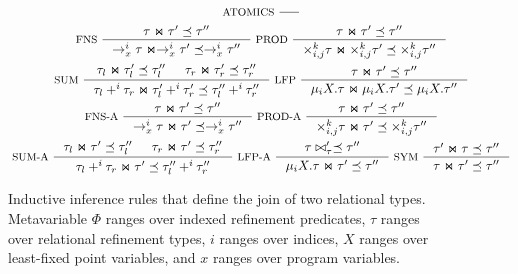 \begin{figure}
  \centering
  \begin{gather*}
    \inference[ ATOMICS ]{ }{ } \\
    \inference[ FNS ]{
      \tau \Join \tau' \subtype \tau'' }{
      \to_x^i \tau \Join \to_x^i \tau' \subtype \to_x^i \tau'' }
    \inference[ PROD ]{
      \tau \Join \tau' \subtype \tau'' }{
      \times_{i, j}^k \tau \Join %
      \times_{i, j}^k \tau' \subtype \times_{i, j}^k \tau'' } \\
    \inference[ SUM ]{
      \tau_l \Join \tau_l' \subtype \tau_l'' &
      \tau_r \Join \tau_r' \subtype \tau_r'' }{
      \tau_l +^i \tau_r \Join \tau_l' +^i \tau_r' %
      \subtype \tau_l'' +^i \tau_r'' } 
    \inference[ LFP ]{
      \tau \Join \tau' \subtype \tau'' }{
      \mu_i X. \tau \Join \mu_i X. \tau' \subtype %
      \mu_i X. \tau'' } \\
    \inference[ FNS-A ]{
      \tau \Join \tau' \subtype \tau'' }{
      \to_x^i \tau \Join \tau' \subtype \to_x^i \tau'' }
    \inference[ PROD-A ]{
      \tau \Join \tau' \subtype \tau'' }{
      \times_{i, j}^k \tau \Join \tau' \subtype %
      \times_{i, j}^k \tau'' } \\
    \inference[ SUM-A ]{
      \tau_l \Join \tau' \subtype \tau_l'' &
      \tau_r \Join \tau' \subtype \tau_r'' }{
      \tau_l +^i \tau_r \Join \tau' %
      \subtype \tau_l'' +^i \tau_r'' } 
    \inference[ LFP-A ]{
      \tau \join \tau' \subtype \tau'' }{
      \mu_i X. \tau \Join \tau' \subtype \tau'' } 
    \inference[ SYM ]{ %
      \tau' \Join \tau \subtype \tau'' }{ %
      \tau \Join \tau' \subtype \tau'' } 
  \end{gather*}
  \caption{Inductive inference rules that define the join of two relational types.
    Metavariable $\Phi$ ranges over indexed refinement predicates, %
    $\tau$ ranges over relational refinement types, %
    $i$ ranges over indices, %
    $X$ ranges over least-fixed point variables, and %
    $x$ ranges over program variables. }
  \label{fig:join}
\end{figure}
